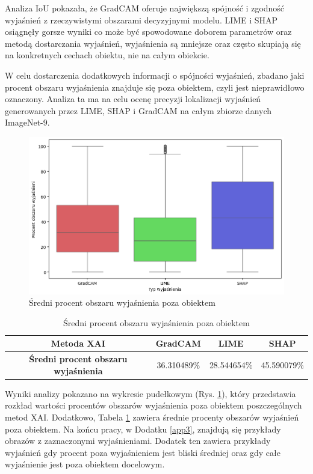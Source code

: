 Analiza IoU pokazała, że GradCAM oferuje największą spójność i zgodność wyjaśnień z rzeczywistymi obszarami decyzyjnymi modelu.
LIME i SHAP osiągnęły gorsze wyniki co może być spowodowane doborem parametrów oraz metodą dostarczania wyjaśnień, wyjaśnienia są mniejsze oraz często skupiają się na konkretnych cechach obiektu, nie na całym obiekcie.

\vspace{1cm}

W celu dostarczenia dodatkowych informacji o spójności wyjaśnień, zbadano jaki procent obszaru wyjaśnienia znajduje się poza obiektem, czyli jest nieprawidłowo oznaczony.
Analiza ta ma na celu ocenę precyzji lokalizacji wyjaśnień generowanych przez LIME, SHAP i GradCAM na całym zbiorze danych ImageNet-9.

\begin{figure}[h]
	\centering\includegraphics[width=.9\textwidth]{img/areaincorrect}
	\caption{Średni procent obszaru wyjaśnienia poza obiektem}  \label{rys:areaincorrect}
\end{figure}

\begin{table}[h]
	\centering
	\begin{tabular}{|c|c|c|c|}
		\hline
		\textbf{Metoda XAI}                          & \textbf{GradCAM} & \textbf{LIME} & \textbf{SHAP} \\
		\hline
		\textbf{Średni procent obszaru wyjaśnienia } & 36.310489\%      & 28.544654\%   & 45.590079\%   \\
		\hline
	\end{tabular}
	\caption{Średni procent obszaru wyjaśnienia poza obiektem}
	\label{tab:areaincorrect}
\end{table}

Wyniki analizy pokazano na wykresie pudełkowym (Rys. \ref{rys:areaincorrect}), który przedstawia rozkład wartości procentów obszarów wyjaśnienia poza obiektem poszczególnych metod XAI.
Dodatkowo, Tabela \ref{tab:areaincorrect} zawiera średnie procenty obszarów wyjaśnień poza obiektem.
Na końcu pracy, w Dodatku \ref{app3}, znajdują się przykłady obrazów z zaznaczonymi wyjaśnieniami.
Dodatek ten zawiera przykłady wyjaśnień gdy procent poza wyjaśnieniem jest bliski średniej oraz gdy całe wyjaśnienie jest poza obiektem docelowym.

